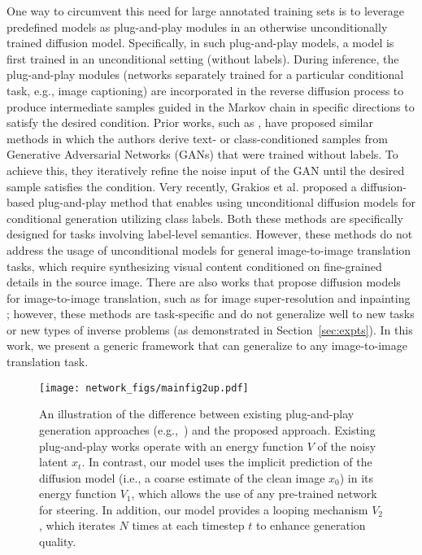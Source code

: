 \documentclass[10pt,twocolumn,letterpaper]{article}
\begin{document}
One way to circumvent this need for large annotated training sets is to leverage predefined models as plug-and-play modules \cite{nguyen2017plug, graikos2022diffusion,nair2023unite} in an otherwise unconditionally trained diffusion model. Specifically, in such plug-and-play models, a model is first trained in an unconditional setting (without labels). During inference, the plug-and-play modules (networks separately trained for a particular conditional task, e.g., image captioning) are incorporated in the reverse diffusion process to produce intermediate samples guided in the Markov chain in specific directions to satisfy the desired condition. Prior works, such as \cite{nguyen2017plug,nguyen2016synthesizing}, have proposed similar methods in which the authors derive text- or class-conditioned samples from Generative Adversarial Networks (GANs)\cite{goodfellow2020generative} that were trained without labels. To achieve this, they iteratively refine the noise input of the GAN until the desired sample satisfies the condition. Very recently, Grakios et al. \cite{graikos2022diffusion} proposed a diffusion-based plug-and-play method that enables using unconditional diffusion models for conditional generation utilizing class labels. Both these methods are specifically designed for tasks involving label-level semantics. However, these methods do not address the usage of unconditional models for general image-to-image translation tasks, which require synthesizing visual content conditioned on fine-grained details in the source image. There are also works that propose diffusion models for image-to-image translation, such as for image super-resolution and inpainting \cite{choi2021ilvr,lugmayr2022repaint }; however, these methods are task-specific and do not generalize well to new tasks or new types of inverse problems (as demonstrated in Section~\ref{sec:expts}). In this work, we present a generic framework that can generalize to any image-to-image translation task.


\begin{figure}[tb]
    \centering
    \texttt{[image: network\_figs/mainfig2up.pdf]}
    \vspace{-6mm}
  \caption{{An illustration of the difference between existing plug-and-play generation approaches (e.g.,~\cite{graikos2022diffusion}) and the proposed approach.} Existing plug-and-play works operate with an energy function $V$ of the noisy latent $x_t$. In contrast, our model uses the implicit prediction of the diffusion model (i.e., a coarse estimate of the clean image $x_0$) in its energy function $V_1$, which allows the use of any pre-trained network for steering. In addition, our model provides a looping mechanism $V_2$, which iterates $N$ times at each timestep $t$ to enhance generation quality.}
    \label{fig:intro2}
    \vspace{-5mm}
\end{figure}
\end{document}
